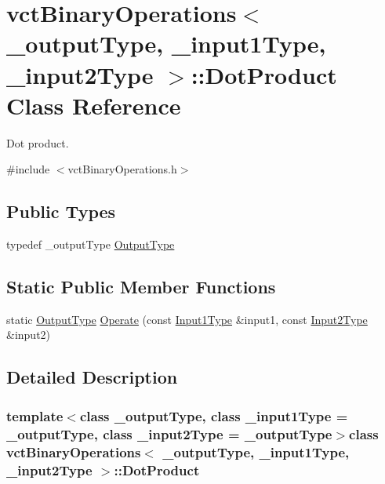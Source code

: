 \hypertarget{classvct_binary_operations_1_1_dot_product}{\section{vct\-Binary\-Operations$<$ \-\_\-output\-Type, \-\_\-input1\-Type, \-\_\-input2\-Type $>$\-:\-:Dot\-Product Class Reference}
\label{classvct_binary_operations_1_1_dot_product}
}


Dot product.  




{\ttfamily \#include $<$vct\-Binary\-Operations.\-h$>$}

\subsection*{Public Types}
\begin{DoxyCompactItemize}
\item 
typedef \-\_\-output\-Type \hyperlink{classvct_binary_operations_1_1_dot_product_a87bd488ca8bd04bf65be037778c285dc}{Output\-Type}
\end{DoxyCompactItemize}
\subsection*{Static Public Member Functions}
\begin{DoxyCompactItemize}
\item 
static \hyperlink{classvct_binary_operations_1_1_dot_product_a87bd488ca8bd04bf65be037778c285dc}{Output\-Type} \hyperlink{classvct_binary_operations_1_1_dot_product_a6d3fec89851f31cc487b4f332c9b0cc9}{Operate} (const \hyperlink{classvct_binary_operations_a5e56a66a012d6a28c539a08a0021c45e}{Input1\-Type} \&input1, const \hyperlink{classvct_binary_operations_a929119af557a04a16b4d854981e49e1b}{Input2\-Type} \&input2)
\end{DoxyCompactItemize}


\subsection{Detailed Description}
\subsubsection*{template$<$class \-\_\-output\-Type, class \-\_\-input1\-Type = \-\_\-output\-Type, class \-\_\-input2\-Type = \-\_\-output\-Type$>$class vct\-Binary\-Operations$<$ \-\_\-output\-Type, \-\_\-input1\-Type, \-\_\-input2\-Type $>$\-::\-Dot\-Product}

